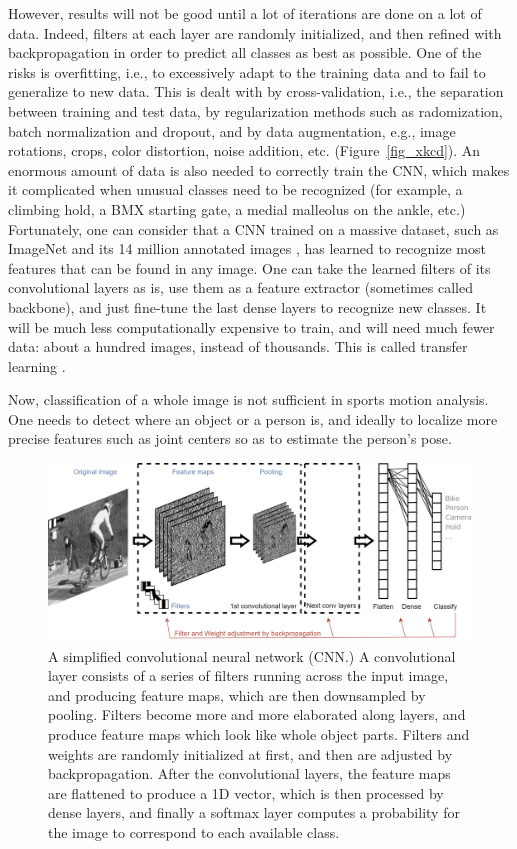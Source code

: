 However, results will not be good until a lot of iterations are done on a lot of data. Indeed, filters at each layer are randomly initialized, and then refined with backpropagation in order to predict all classes as best as possible. One of the risks is overfitting, i.e., to excessively adapt to the training data and to fail to generalize to new data. This is dealt with by cross-validation, i.e., the separation between training and test data, by regularization methods such as radomization, batch normalization and dropout, and by data augmentation, e.g., image rotations, crops, color distortion, noise addition, etc. \cite{Hawkins2004,Chicco2017} (Figure~\ref{fig_xkcd}). An enormous amount of data is also needed to correctly train the CNN, which makes it complicated when unusual classes need to be recognized (for example, a climbing hold, a BMX starting gate, a medial malleolus on the ankle, etc.) Fortunately, one can consider that a CNN trained on a massive dataset, such as ImageNet and its 14 million annotated images \cite{Deng2009}, has learned to recognize most features that can be found in any image. One can take the learned filters of its convolutional layers as is, use them as a feature extractor (sometimes called backbone), and just fine-tune the last dense layers to recognize new classes. It will be much less computationally expensive to train, and will need much fewer data: about a hundred images, instead of thousands. This is called transfer learning \cite{Pan2009}.

Now, classification of a whole image is not sufficient in sports motion analysis. One needs to detect where an object or a person is, and ideally to localize more precise features such as joint centers so as to estimate the person's pose. 

\clearpage
\begin{figure}[hbtp]
	\centering
	\def\svgwidth{1\columnwidth}
	\fontsize{10pt}{10pt}\selectfont
	\includegraphics[width=1\linewidth]{"../Chap2/Figures/Fig_CNN.png"}
	\caption{A simplified convolutional neural network (CNN.) A convolutional layer consists of a series of filters running across the input image, and producing feature maps, which are then downsampled by pooling. Filters become more and more elaborated along layers, and produce feature maps which look like whole object parts. Filters and weights are randomly initialized at first, and then are adjusted by backpropagation. After the convolutional layers, the feature maps are flattened to produce a 1D vector, which is then processed by dense layers, and finally a softmax layer computes a probability for the image to correspond to each available class.} 
	\label{fig_cnn}
\end{figure}


